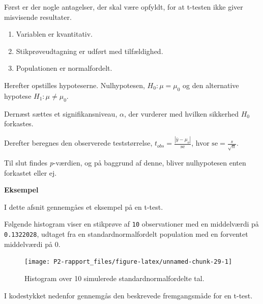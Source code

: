 \documentclass[
]{book}
\providecommand{\tightlist}{%
  \setlength{\itemsep}{0pt}\setlength{\parskip}{0pt}}
\theoremstyle{definition}
\theoremstyle{definition}
\theoremstyle{definition}
\theoremstyle{remark}
\begin{document}
Først er der nogle antagelser, der skal være opfyldt, for at t-testen ikke giver misvisende resultater.

\begin{enumerate}
\def\labelenumi{\arabic{enumi}.}
\tightlist
\item
  Variablen er kvantitativ.
\item
  Stikprøveudtagning er udført med tilfældighed.
\item
  Populationen er normalfordelt.
\end{enumerate}

Herefter opstilles hypoteserne. Nulhypotesen, \(H_0: \mu = \mu_0\) og den alternative hypotese \(H_1: \mu \neq \mu_0\).

Dernæst sættes et signifikansniveau, \(\alpha\), der vurderer med hvilken sikkerhed \(H_0\) forkastes.

Derefter beregnes den observerede teststørrelse, \(t_{obs} = \frac{|\bar y - \mu_o|}{\text{se}}\), hvor \(\text{se} = \frac{s}{\sqrt{n}}\).

Til slut findes \emph{p}-værdien, og på baggrund af denne, bliver nulhypotesen enten forkastet eller ej.

\textbf{Eksempel}

I dette afsnit gennemgåes et eksempel på en t-test.

Følgende histogram viser en stikprøve af \texttt{10} observationer med en middelværdi på \texttt{0.1322028}, udtaget fra en standardnormalfordelt population med en forventet middelværdi på \(0\).

\begin{figure}

{\centering \texttt{[image: P2-rapport\_files/figure-latex/unnamed-chunk-29-1]}

}

\caption{Histogram over 10 simulerede standardnormalfordelte tal.}\label{fig:unnamed-chunk-29}
\end{figure}

I kodestykket nedenfor gennemgås den beskrevede fremgangsmåde for en t-test.
\end{document}
